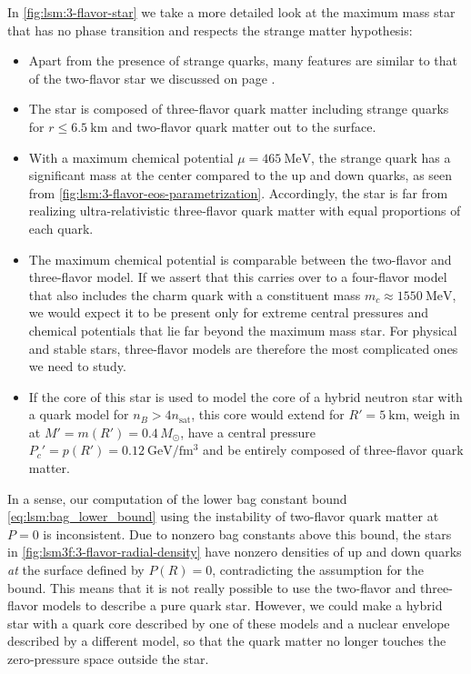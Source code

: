 In \cref{fig:lsm:3-flavor-star} we take a more detailed look at the maximum mass star that has no phase transition and respects the strange matter hypothesis:
\begin{itemize}
\item Apart from the presence of strange quarks, many features are similar to that of the two-flavor star we discussed on page \pageref{list:lsm:2-flavor-star-discussion}.
\item The star is composed of three-flavor quark matter including strange quarks for $r \leq \SI{6.5}{\kilo\meter}$ and two-flavor quark matter out to the surface.
\item With a maximum chemical potential $\mu=\SI{465}{\mega\electronvolt}$, the strange quark has a significant mass at the center compared to the up and down quarks, as seen from \cref{fig:lsm:3-flavor-eos-parametrization}.
      Accordingly, the star is far from realizing ultra-relativistic three-flavor quark matter with equal proportions of each quark.
\item The maximum chemical potential is comparable between the two-flavor and three-flavor model.
      If we assert that this carries over to a four-flavor model that also includes the charm quark with a constituent mass $m_c \approx \SI{1550}{\mega\electronvolt}$,
      we would expect it to be present only for extreme central pressures and chemical potentials that lie far beyond the maximum mass star.
      For physical and stable stars, three-flavor models are therefore the most complicated ones we need to study.
\item If the core of this star is used to model the core of a hybrid neutron star with a quark model for $n_B > 4 n_\text{sat}$,
      this core would extend for $R'=\SI{5}{\kilo\meter}$, weigh in at $M' = m(R') = 0.4 \, M_\odot$, have a central pressure $P_c'=p(R')=\SI{0.12}{\giga\electronvolt\per\femto\meter\cubed}$ and be entirely composed of three-flavor quark matter.
\end{itemize}

In a sense, our computation of the lower bag constant bound \eqref{eq:lsm:bag_lower_bound} using the instability of two-flavor quark matter at $P=0$ is inconsistent.
Due to nonzero bag constants above this bound, the stars in \cref{fig:lsm3f:3-flavor-radial-density} have nonzero densities of up and down quarks \emph{at} the surface defined by $P(R)=0$, contradicting the assumption for the bound.
This means that it is not really possible to use the two-flavor and three-flavor models to describe a pure quark star.
However, we could make a hybrid star with a quark core described by one of these models and a nuclear envelope described by a different model, so that the quark matter no longer touches the zero-pressure space outside the star.

